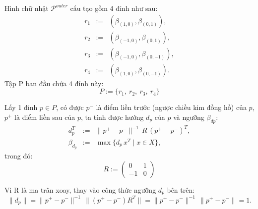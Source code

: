 \documentclass[11pt]{beamer}
\theoremstyle{definition}
\theoremstyle{plain}
\theoremstyle{plain}
\theoremstyle{remark}
\begin{document}
\begin{frame}
	Hình chữ nhật $\mathcal{P}^{outer}$ cấu tạo gồm 4 đỉnh như sau:
\begin{equation}\label{def_4r-1}
	\begin{array}{lcl}
		r_1 &:=& (\beta_{(1, 0)}, \beta_{(0, 1)}), \\
		r_2 &:=& (\beta_{(-1, 0)}, \beta_{(0, 1)}), \\
		r_3 &:=& (\beta_{(-1, 0)}, \beta_{(0, -1)}), \\
		r_4 &:=& (\beta_{(1, 0)}, \beta_{(0, -1)}).
	\end{array}
\end{equation}
Tập P ban đầu chứa 4 đỉnh này:\\
\begin{equation}\label{def_4r-2}
	P := \{r_1,\ r_2,\ r_3,\ r_4\}
\end{equation}
\end{frame}
\begin{frame}
	Lấy 1 đỉnh $p \in P$, có được $p^{-}$ là điểm liền trước (ngược chiều kim đồng hồ) của $p$, $p^{+}$ là điểm liền sau của $p$, ta tính được hướng $d_p$ của $p$ và ngưỡng $\beta_{dp}$:\\
	\begin{equation}\label{def_d_p}
		\begin{array}{lcl}
			d_{p}^T &:=& \|p^+ - p^-\|^{-1}\, R \, (p^+ - p^-)^T, \\
			\beta_{d_{p}} &:=& \max\{d_{p}\, x^T \mid x \in X\},
		\end{array}
	\end{equation}
	trong đó: 
	\begin{equation}\label{rotationmatrix}
		R := \begin{pmatrix}
			0 & 1 \\
			-1 & 0
		\end{pmatrix}
	\end{equation}
\end{frame}
\begin{frame}
	Vì R là ma trân xoay, thay vào công thức ngưỡng $d_p$ bên trên:
	\begin{equation}\label{def_d_p1}
		\|d_{p}\| = \|p^+ - p^-\|^{-1}\, \|(p^+ - p^-) R^T\| = \|p^+ - p^-\|^{-1}\, \|p^+ - p^-\| = 1.
	\end{equation}
\end{frame}
\end{document}
